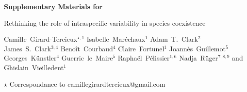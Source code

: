 
\begin{center}
  \Large{\textbf{Supplementary Materials for}}
\end{center}

\vspace{1cm}

\begin{center}
  \LARGE{Rethinking the role of intraspecific variability in species coexistence}
\end{center}

\vspace{1cm}

\begin{center}
  \large{
  Camille~Girard-Tercieux$^{\star, 1}$ \hspace{0.5cm} Isabelle~Maréchaux$^{1}$ \hspace{0.5cm} Adam~T.~Clark$^2$ \hspace{0.5cm} James~S.~Clark$^{3,4}$ \hspace{0.5cm} Benoît~Courbaud$^{4}$ \hspace{0.5cm} Claire~Fortunel$^{1}$ \hspace{0.5cm} Joannès~Guillemot$^{5}$ \hspace{0.5cm} Georges~Künstler$^{4}$ \hspace{0.5cm} Guerric~le~Maire$^{5}$ \hspace{0.5cm} Raphaël~Pélissier$^{1, 6}$ \hspace{0.5cm} Nadja~Rüger$^{7, 8, 9}$ \hspace{0.5cm} and Ghislain~Vieilledent$^{1}$
  }
\end{center}

\vspace{0.5cm}

\begin{center}
  $\star$ Correspondance to camillegirardtercieux@gmail.com\\
\end{center}

\vspace{0.5cm}

